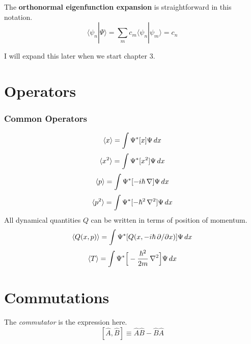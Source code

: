 The \textbf{orthonormal eigenfunction expansion} is straightforward in this notation.
\begin{equation*}
    \langle\psi_n|\Psi\rangle = \sum_m c_m \langle\psi_n|\psi_m\rangle = c_n
\end{equation*}

I will expand this later when we start chapter 3.



\section{Operators}
\subsubsection{Common Operators}
\begin{equation}\label{eq:x-operator}
    \langle x \rangle = \int \Psi^* [x]\Psi \,dx
\end{equation}
\begin{equation}\label{eq:x2-operator}
    \langle x^2 \rangle = \int \Psi^* [x^2]\Psi \,dx
\end{equation}
\begin{equation}\label{eq:p-operator}
    \langle p \rangle = \int \Psi^* [-i\hbar\, \nabla]\Psi \,dx
\end{equation}
\begin{equation}\label{eq:p2-operator}
    \langle p^2 \rangle = \int \Psi^* [-\hbar^2\, \nabla^2]\Psi \,dx
\end{equation}
All dynamical quantities $Q$ can be written in terms of position of momentum.
\begin{equation}\label{eq:q-operator}
    \langle Q(x,p) \rangle = \int \Psi^* [Q(x,-i\hbar\, \partial/\partial x)]\Psi \,dx
\end{equation}
\begin{equation}\label{eq:T-operator}
    \langle T \rangle = \int{ \Psi^* \Big[-\frac{\hbar^2}{2m}\, \nabla^2\Big]\Psi \,dx}
\end{equation}



\section{Commutations}
The \textit{commutator} is the expression here.
\begin{equation}\label{eq:commutator}
    [\hat{A},\hat{B}] \equiv \hat{A}\hat{B} - \hat{B}\hat{A}
\end{equation}
